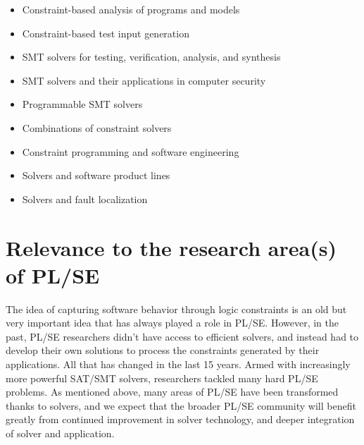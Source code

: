 \documentclass{sig-alternate}
\begin{document}
\begin{itemize}
\item Constraint-based analysis of programs and models
\item Constraint-based test input generation
\item SMT solvers for testing, verification, analysis, and synthesis
\item SMT solvers and their applications in computer security
\item Programmable SMT solvers
\item Combinations of constraint solvers
\item Constraint programming and software engineering
\item Solvers and software product lines
\item Solvers and fault localization
\end{itemize}

\section{Relevance to the research area(s) of PL/SE}
\vspace{0.2cm} The idea of capturing software behavior through logic
constraints is an old but very important idea that has always played a
role in PL/SE.  However, in the past, PL/SE researchers didn't have access to
efficient solvers, and instead had to develop their own solutions to
process the constraints generated by their applications. All that
has changed in the last 15 years. Armed with increasingly more powerful SAT/SMT
solvers, researchers tackled many hard PL/SE problems. As mentioned
above, many areas of PL/SE have been transformed thanks to solvers, and we
expect that the broader PL/SE community will benefit greatly from
continued improvement in solver technology, and deeper integration of
solver and application.
\end{document}
